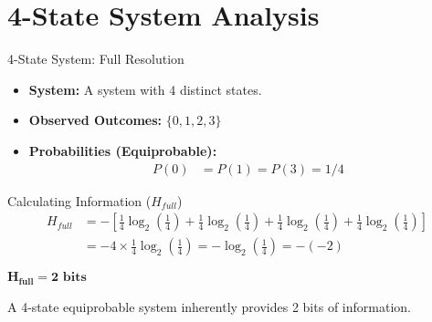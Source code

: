 \documentclass{beamer}
\begin{document}
\section{4-State System Analysis}
\begin{frame}{4-State System: Full Resolution}
    \begin{itemize}
        \item \textbf{System:} A system with 4 distinct states.
        \item \textbf{Observed Outcomes:} $\{0, 1, 2, 3\}$
        \item \textbf{Probabilities (Equiprobable):}
            \begin{align*}
                P(0) &=
                P(1) =
                P(3) = 1/4
            \end{align*}
    \end{itemize}
    \pause
    \begin{block}{Calculating Information ($H_{full}$)}
        \begin{align*}
            H_{full} &= - \left[ \frac{1}{4} \log_2 \left(\frac{1}{4}\right) + \frac{1}{4} \log_2 \left(\frac{1}{4}\right) + \frac{1}{4} \log_2 \left(\frac{1}{4}\right) + \frac{1}{4} \log_2 \left(\frac{1}{4}\right) \right] \\
            &= -4 \times \frac{1}{4} \log_2 \left(\frac{1}{4}\right)
             = -\log_2 \left(\frac{1}{4}\right) = -(-2)
        \end{align*}
        \begin{center}
            $\boldsymbol{H_{full} = 2 \text{ bits}}$
        \end{center}
        \vspace{0.5em}
        \alert{A 4-state equiprobable system inherently provides 2 bits of information.}
    \end{block}
\end{frame}
\end{document}
